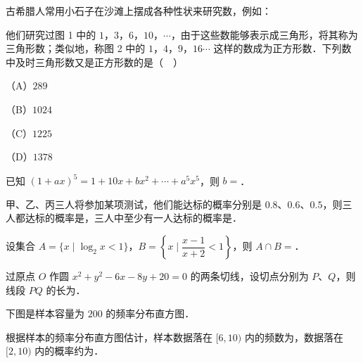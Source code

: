 \begingroup
\renewenvironment{question}{\Needspace{0.5\textheight}}{}
\begin{question}
古希腊人常用小石子在沙滩上摆成各种性状来研究数，例如：
\nopagebreak[4]
\begin{center}\end{center}
\nopagebreak[4]
他们研究过图 1 中的 $1$，$3$，$6$，$10$，$\cdots$，由于这些数能够表示成三角形，将其称为三角形数；类似地，称图 2 中的 $1$，$4$，$9$，$16\cdots$ 这样的数成为正方形数．下列数中及时三角形数又是正方形数的是（　）

（A）$289$

（B）$1024$

（C）$1225$

（D）$1378$

\end{question}
\endgroup
{}

\begin{question}
已知 $(1+ax)^5=1+10x+bx^2+\cdots+a^5x^5$，则 $b=$\gkblank{}．

\end{question}
\begin{question}
甲、乙、丙三人将参加某项测试，他们能达标的概率分别是 $0.8$、$0.6$、$0.5$，则三人都达标的概率是\gkblank{}，三人中至少有一人达标的概率是\gkblank{}．

\end{question}
\begin{question}
设集合 $A=\{x\mid\log_2x<1\}$，$B=\left\{x\mid\dfrac{x-1}{x+2}<1\right\}$，则 $A\cap B=$\gkblank{}．

\end{question}
\begin{question}
过原点 $O$ 作圆 $x^2+y^2-6x-8y+20=0$ 的两条切线，设切点分别为 $P$、$Q$，则线段 $PQ$ 的长为\gkblank{}．

\Needspace{0.4\textheight}
\end{question}
\begingroup
\renewenvironment{question}{\Needspace{0.4\textheight}}{}
\begin{question}
下图是样本容量为 $200$ 的频率分布直方图．
\nopagebreak[4]
\begin{center}\end{center}
\nopagebreak[4]
根据样本的频率分布直方图估计，样本数据落在 $[6,10)$ 内的频数为\gkblank{}，数据落在 $[2,10)$ 内的概率约为\gkblank{}．

\end{question}
\endgroup
{}

